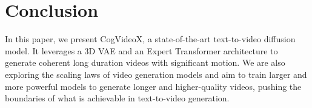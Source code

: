 \section{Conclusion}

In this paper, we present CogVideoX, a state-of-the-art text-to-video diffusion model. It leverages a 3D VAE and an Expert Transformer architecture to generate coherent long duration videos with significant motion. We are also exploring the scaling laws of video generation models and aim to train larger and more powerful models to generate longer and higher-quality videos, pushing the boundaries of what is achievable in text-to-video generation.